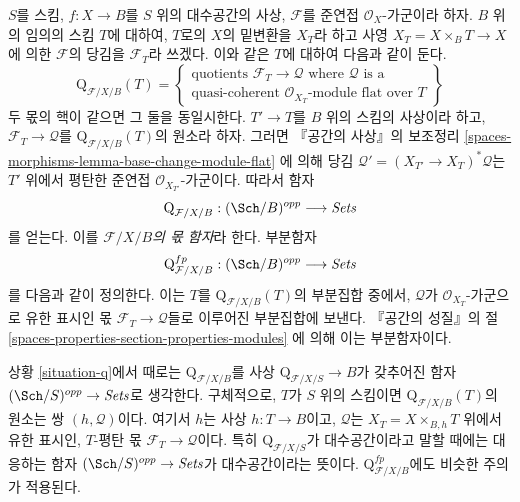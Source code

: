 \begin{situation}
\label{situation-q}
$S$를 스킴, $f : X \to B$를 $S$ 위의 대수공간의 사상,
$\mathcal{F}$를 준연접 $\mathcal{O}_X$-가군이라 하자.
$B$ 위의 임의의 스킴 $T$에 대하여, $T$로의 $X$의 밑변환을 $X_T$라 하고
사영 $X_T = X \times_B T \to X$에 의한 $\mathcal{F}$의 당김을
$\mathcal{F}_T$라 쓰겠다. 이와 같은 $T$에 대하여 다음과 같이 둔다.
$$
\text{Q}_{\mathcal{F}/X/B}(T) =
\left\{
\begin{matrix}
\text{quotients }\mathcal{F}_T \to \mathcal{Q}\text{ where }
\mathcal{Q}\text{ is a}\\
\text{quasi-coherent }
\mathcal{O}_{X_T}\text{-module flat over }T
\end{matrix}
\right\}
$$
두 몫의 핵이 같으면 그 둘을 동일시한다. $T' \to T$를 $B$ 위의
스킴의 사상이라 하고, $\mathcal{F}_T \to \mathcal{Q}$를
$\text{Q}_{\mathcal{F}/X/B}(T)$의 원소라 하자. 그러면 『공간의 사상』의
보조정리
\ref{spaces-morphisms-lemma-base-change-module-flat}
에 의해 당김 $\mathcal{Q}' = (X_{T'} \to X_T)^*\mathcal{Q}$는
$T'$ 위에서 평탄한 준연접 $\mathcal{O}_{X_{T'}}$-가군이다.
따라서 함자
\begin{equation}
\label{equation-q}
\text{Q}_{\mathcal{F}/X/B} : (\Sch/B)^{opp} \longrightarrow \textit{Sets}
\end{equation}
를 얻는다. 이를 {\it $\mathcal{F}/X/B$의 몫 함자}라 한다.
부분함자
\begin{equation}
\label{equation-q-fp}
\text{Q}^{fp}_{\mathcal{F}/X/B} : (\Sch/B)^{opp} \longrightarrow \textit{Sets}
\end{equation}
를 다음과 같이 정의한다. 이는 $T$를 $\text{Q}_{\mathcal{F}/X/B}(T)$의
부분집합 중에서, $\mathcal{Q}$가 $\mathcal{O}_{X_T}$-가군으로 유한 표시인
몫 $\mathcal{F}_T \to \mathcal{Q}$들로 이루어진 부분집합에 보낸다.
『공간의 성질』의 절
\ref{spaces-properties-section-properties-modules}
에 의해 이는 부분함자이다.
\end{situation}

\noindent
상황 \ref{situation-q}에서 때로는 $\text{Q}_{\mathcal{F}/X/B}$를 사상
$\text{Q}_{\mathcal{F}/X/S} \to B$가 갖추어진 함자
$(\Sch/S)^{opp} \to \textit{Sets}$로 생각한다.
구체적으로, $T$가 $S$ 위의 스킴이면 $\text{Q}_{\mathcal{F}/X/B}(T)$의
원소는 쌍 $(h, \mathcal{Q})$이다. 여기서 $h$는 사상 $h : T \to B$이고,
$\mathcal{Q}$는 $X_T = X \times_{B, h} T$ 위에서 유한 표시인,
$T$-평탄 몫 $\mathcal{F}_T \to \mathcal{Q}$이다. 특히
$\text{Q}_{\mathcal{F}/X/S}$가 대수공간이라고 말할 때에는 대응하는 함자
$(\Sch/S)^{opp} \to \textit{Sets}$가 대수공간이라는 뜻이다.
$\text{Q}^{fp}_{\mathcal{F}/X/B}$에도 비슷한 주의가 적용된다.


